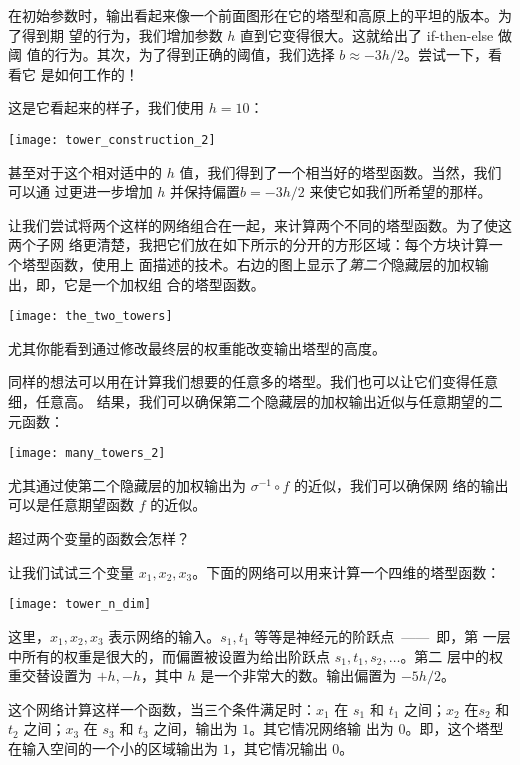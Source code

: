 在初始参数时，输出看起来像一个前面图形在它的塔型和高原上的平坦的版本。为了得到期
望的行为，我们增加参数 $h$ 直到它变得很大。这就给出了 {\serif if-then-else} 做阈
值的行为。其次，为了得到正确的阈值，我们选择 $b \approx -3h/2$。尝试一下，看看它
是如何工作的！

这是它看起来的样子，我们使用 $h = 10$：
\begin{center}
  \texttt{[image: tower\_construction\_2]}
\end{center}

甚至对于这个相对适中的 $h$ 值，我们得到了一个相当好的塔型函数。当然，我们可以通
过更进一步增加 $h$ 并保持偏置$b = -3h/2$ 来使它如我们所希望的那样。

让我们尝试将两个这样的网络组合在一起，来计算两个不同的塔型函数。为了使这两个子网
络更清楚，我把它们放在如下所示的分开的方形区域：每个方块计算一个塔型函数，使用上
面描述的技术。右边的图上显示了\emph{第二个}隐藏层的加权输出，即，它是一个加权组
合的塔型函数。
\begin{center}
  \texttt{[image: the\_two\_towers]}
\end{center}

尤其你能看到通过修改最终层的权重能改变输出塔型的高度。

同样的想法可以用在计算我们想要的任意多的塔型。我们也可以让它们变得任意细，任意高。
结果，我们可以确保第二个隐藏层的加权输出近似与任意期望的二元函数：
\begin{center}
  \texttt{[image: many\_towers\_2]}
\end{center}

尤其通过使第二个隐藏层的加权输出为 $\sigma^{-1} \circ f$ 的近似，我们可以确保网
络的输出可以是任意期望函数 $f$ 的近似。

超过两个变量的函数会怎样？

让我们试试三个变量 $x_1, x_2, x_3$。下面的网络可以用来计算一个四维的塔型函数：
\begin{center}
  \texttt{[image: tower\_n\_dim]}
\end{center}

这里，$x_1, x_2, x_3$ 表示网络的输入。$s_1, t_1$ 等等是神经元的阶跃点~——~即，第
一层中所有的权重是很大的，而偏置被设置为给出阶跃点 $s_1, t_1, s_2, \ldots$。第二
层中的权重交替设置为 $+h, -h$，其中 $h$ 是一个非常大的数。输出偏置为 $-5h/2$。

这个网络计算这样一个函数，当三个条件满足时：$x_1$ 在 $s_1$ 和 $t_1$ 之间；$x_2$
在$s_2$ 和 $t_2$ 之间；$x_3$ 在 $s_3$ 和 $t_3$ 之间，输出为 $1$。其它情况网络输
出为 $0$。即，这个塔型在输入空间的一个小的区域输出为 $1$，其它情况输出 $0$。

